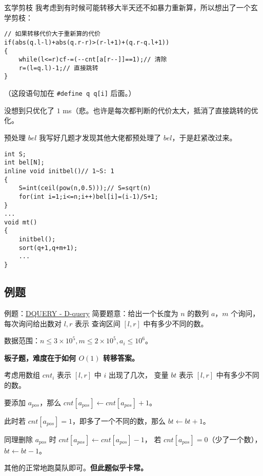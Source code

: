 \documentclass[table]{beamer}
\begin{document}
\begin{frame}[fragile]{玄学剪枝}
	我考虑到有时候可能转移大半天还不如暴力重新算，所以想出了一个玄学剪枝：
	\begin{verbatim}
// 如果转移代价大于重新算的代价
if(abs(q.l-l)+abs(q.r-r)>(r-l+1)+(q.r-q.l+1))
{
    while(l<=r)cf-=(--cnt[a[r--]]==1);// 清除
    r=(l=q.l)-1;// 直接跳转
}
\end{verbatim}
	（这段语句加在 \verb|#define q q[i]| 后面。）

	没想到只优化了 $1$ ms（悲。也许是每次都判断的代价太大，抵消了直接跳转的优化。
\end{frame}

\begin{frame}[fragile]{预处理 $bel$}
	我写好几题才发现其他大佬都预处理了 $bel$，于是赶紧改过来。
	\small
\begin{verbatim}
int S;
int bel[N];
inline void initbel()// 1~S: 1
{
    S=int(ceil(pow(n,0.5)));// S=sqrt(n)
    for(int i=1;i<=n;i++)bel[i]=(i-1)/S+1;
}
...
void mt()
{
    initbel();
    sort(q+1,q+m+1);
    ...
}
\end{verbatim}
\end{frame}

\subsection{例题}

\begin{frame}
{例题：{\color{blue}\href{https://www.luogu.com.cn/problem/SP3267}{DQUERY - D-query}}}
	简要题意：给出一个长度为 $n$ 的数列 $a$，$m$ 个询问，每次询问给出数对 $l,r$ 表示
	查询区间 $[l,r]$ 中有多少不同的数。

	数据范围：$n\le 3\times10^5,m\le2\times10^5,a_i\le10^6$。
	\pause

	\textbf{板子题，难度在于如何 $O(1)$ 转移答案。}
	\pause

	考虑用数组 $cnt_i$ 表示 $[l,r]$ 中 $i$ 出现了几次，
	变量 $bt$ 表示 $[l,r]$ 中有多少不同的数。
	
	要添加 $a_{pos}$，那么 $cnt[a_{pos}]\gets cnt[a_{pos}]+1$。

	此时若 $cnt[a_{pos}]=1$，即多了一个不同的数，那么 $bt\gets bt+1$。

	同理删除 $a_{pos}$ 时 $cnt[a_{pos}]\gets cnt[a_{pos}]-1$，
	若 $cnt[a_{pos}]=0$（少了一个数），$bt\gets bt-1$。

	其他的正常地跑莫队即可。\textbf{但此题似乎卡常。}
\end{frame}
\end{document}
